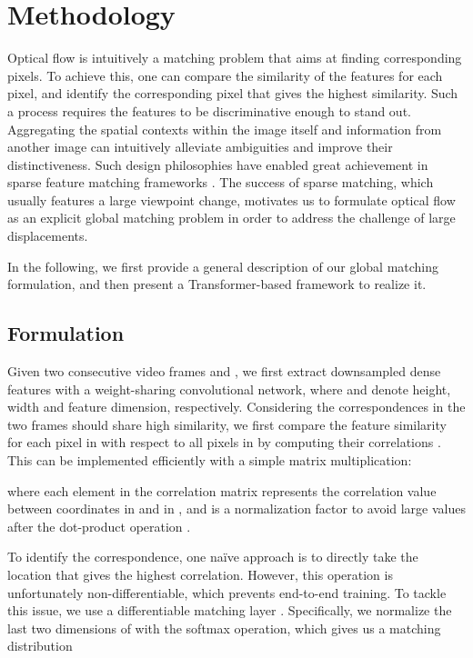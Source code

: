 \documentclass[10pt,twocolumn,letterpaper]{article}
\begin{document}
\section{Methodology}
Optical flow is intuitively a matching problem that aims at finding corresponding pixels. To achieve this, one can compare the similarity of the features for each pixel, and identify the corresponding pixel that gives the highest similarity. Such a process requires the features to be discriminative enough to stand out. Aggregating the spatial contexts within the image itself and information from another image can intuitively alleviate ambiguities and improve their distinctiveness. Such design philosophies have enabled great achievement in sparse feature matching frameworks \cite{sarlin2020superglue,sun2021loftr}. The success of sparse matching, which usually features a large viewpoint change, motivates us to formulate optical flow as an explicit global matching problem in order to address the challenge of large displacements.

In the following, we first provide a general description of our global matching formulation, and then present a Transformer-based framework to realize it.


\subsection{Formulation}
\label{sec:formulation}
Given two consecutive video frames  and , we first extract downsampled dense features  with a weight-sharing convolutional network, where  and  denote height, width and feature dimension, respectively. Considering the correspondences in the two frames should share high similarity, we first compare the feature similarity for each pixel in  with respect to all pixels in  by computing their correlations \cite{wang2020learning}. This can be implemented efficiently with a simple matrix multiplication:

where each element in the correlation matrix  represents the correlation value between coordinates  in  and  in , and  is a normalization factor to avoid large values after the dot-product operation \cite{vaswani2017attention}.

To identify the correspondence, one na\"ive approach is to directly take the location that gives the highest correlation. However, this operation is unfortunately non-differentiable, which prevents end-to-end training. To tackle this issue, we use a differentiable matching layer \cite{wang2020learning,kendall2017end,xu2020aanet}. Specifically, we normalize the last two dimensions of  with the softmax operation, which gives us a matching distribution
\end{document}
